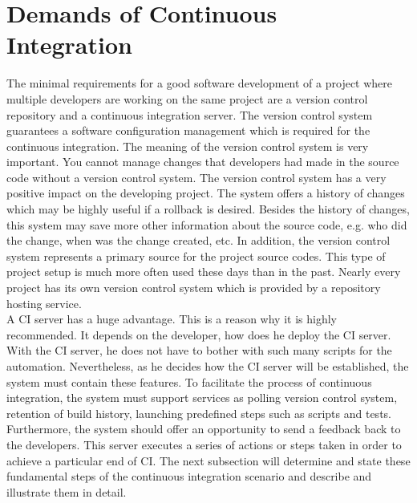 \section{Demands of Continuous Integration}

The minimal requirements for a good software development of a project where multiple developers are working on the same project are a version control repository and a continuous integration server. The version control system guarantees a software configuration management which is required for the continuous integration. The meaning of the version control system is very important. You cannot manage changes that developers had made in the source code without a version control system. The version control system has a very positive impact on the developing project. The system offers a history of changes which may be highly useful if a rollback is desired. Besides the history of changes, this system may save more other information about the source code, e.g. who did the change, when was the change created, etc. In addition, the version control system represents a primary source for the project source codes. This type of project setup is much more often used these days than in the past. Nearly every project has its own version control system which is provided by a repository hosting service.\\

A CI server has a huge advantage. This is a reason why it is highly recommended. It depends on the developer, how does he deploy the CI server. With the CI server, he does not have to bother with such many scripts for the automation. Nevertheless, as he decides how the CI server will be established, the system must contain these features. To facilitate the process of continuous integration, the system must support services as polling version control system, retention of build history, launching predefined steps such as scripts and tests. Furthermore, the system should offer an opportunity to send a feedback back to the developers. This server executes a series of actions or steps taken in order to achieve a particular end of CI. The next subsection will determine and state these fundamental steps of the continuous integration scenario and describe and illustrate them in detail.

